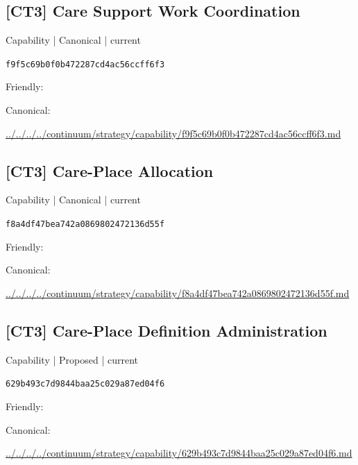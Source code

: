 \documentclass[10pt,a4paper]{article}
\begin{document}
\subsection*{[CT3] Care Support Work Coordination}
{\small Capability | Canonical | current}\par
\texttt{f9f5c69b0f0b472287cd4ac56ccff6f3}\par
Friendly: \par
Canonical: \par
{\footnotesize\url{../../../../continuum/strategy/capability/f9f5c69b0f0b472287cd4ac56ccff6f3.md}}\par
\subsection*{[CT3] Care-Place Allocation}
{\small Capability | Canonical | current}\par
\texttt{f8a4df47bea742a0869802472136d55f}\par
Friendly: \par
Canonical: \par
{\footnotesize\url{../../../../continuum/strategy/capability/f8a4df47bea742a0869802472136d55f.md}}\par
\subsection*{[CT3] Care-Place Definition Administration}
{\small Capability | Proposed | current}\par
\texttt{629b493c7d9844baa25c029a87ed04f6}\par
Friendly: \par
Canonical: \par
{\footnotesize\url{../../../../continuum/strategy/capability/629b493c7d9844baa25c029a87ed04f6.md}}\par
\end{document}
